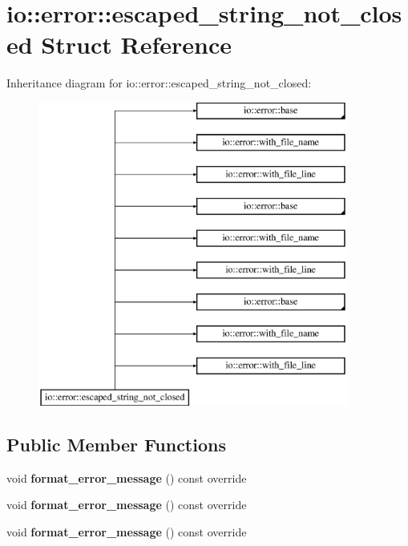 \hypertarget{structio_1_1error_1_1escaped__string__not__closed}{}\section{io\+:\+:error\+:\+:escaped\+\_\+string\+\_\+not\+\_\+closed Struct Reference}
\label{structio_1_1error_1_1escaped__string__not__closed}
Inheritance diagram for io\+:\+:error\+:\+:escaped\+\_\+string\+\_\+not\+\_\+closed\+:\begin{figure}[H]
\begin{center}
\leavevmode
\includegraphics[height=10.000000cm]{d1/de8/structio_1_1error_1_1escaped__string__not__closed}
\end{center}
\end{figure}
\subsection*{Public Member Functions}
\begin{DoxyCompactItemize}
\item 
\mbox{\label{structio_1_1error_1_1escaped__string__not__closed_a866af460ae3e64656b15a6cad91fc48a}} 
void {\bfseries format\+\_\+error\+\_\+message} () const override
\item 
\mbox{\label{structio_1_1error_1_1escaped__string__not__closed_a866af460ae3e64656b15a6cad91fc48a}} 
void {\bfseries format\+\_\+error\+\_\+message} () const override
\item 
\mbox{\label{structio_1_1error_1_1escaped__string__not__closed_a866af460ae3e64656b15a6cad91fc48a}} 
void {\bfseries format\+\_\+error\+\_\+message} () const override
\end{DoxyCompactItemize}
